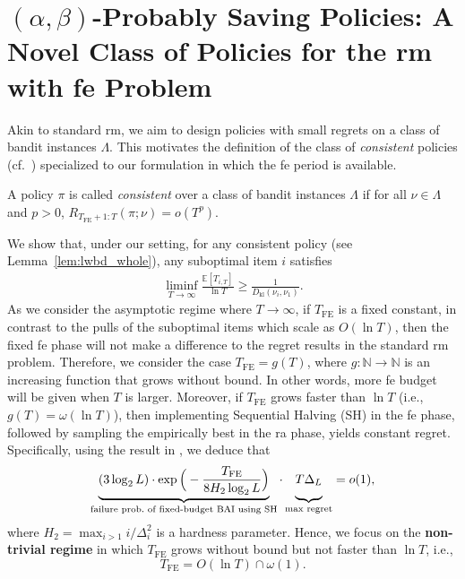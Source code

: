 \documentclass[twoside,11pt]{article}
\newcommand{\kl}{D_{\mathrm{kl}}}
\newcommand{\bbE}{\mathbb{E}}
\newcommand{\bbN}{\mathbb{N}}
\newcommand{\Tfe}{T_{\mathrm{FE}}}
\begin{document}
\section{$(\alpha, \beta)$-Probably Saving Policies: A Novel Class of Policies for the \ac{rm} with \ac{fe} Problem} \label{sec:alpha_beta}
Akin to standard \ac{rm}, we aim to design policies with small regrets on a class of bandit instances $\Lambda$. This motivates the definition of the class of \emph{consistent} policies (cf.\ \citet{lai1985asymptotically}) specialized to our formulation in which the \ac{fe} period is available.
\begin{definition}
    A policy $\pi$ is called \emph{consistent} over a class of bandit instances $\Lambda$ if for all $\nu\in\Lambda$ and $p>0$,
    $
         R_{\Tfe+1:T} (\pi;\nu )= o(T^p). %
    $
\end{definition}
We show that, under our setting, for any consistent policy (see Lemma~\ref{lem:lwbd_whole}), any suboptimal item $i$ satisfies
\begin{align}\label{equ:itemi_lwbd}
    \liminf_{T\to\infty}\frac{\bbE[T_{i,T}]}{\ln T}\geq \frac{1}{\kl(\nu_i,\nu_1)} .
\end{align}
As we  consider the asymptotic regime where $T\to\infty$, if $\Tfe$ is a fixed constant, in contrast to the pulls of the suboptimal items which scale as $O(\ln T)$, then the fixed \ac{fe} phase will not make a difference to the regret results in the standard \ac{rm} problem. 
Therefore, we consider the case $\Tfe = g(T)$, where $g:\bbN\to\bbN$ is an increasing function that grows without bound. In other words, more \ac{fe} budget will be given when $T$ is larger.
Moreover, if $\Tfe$ grows faster than $\ln T$ (i.e., $g(T) = \omega( \ln T )$), then implementing Sequential Halving (SH) \citep{karnin2013optimal} in the \ac{fe} phase, followed by sampling the empirically best  in the \ac{ra} phase, yields constant regret. Specifically, using the result in \citet[Theorem~4.1]{karnin2013optimal}, we deduce that
\begin{align}
    \underbrace{ (3\log_2 L)\cdot \exp\Big(-\frac{\Tfe}{8H_2\log_2 L}\Big)}_{\text{failure prob.\ of fixed-budget BAI using SH}}\cdot \underbrace{\vphantom{\frac{-\Tfe}{8H_2\log_2 L}} T\Delta_{L}}_{\text{max regret}} = o(1),
\end{align}
where $H_2 = \max_{i>1}i/\Delta_i^{2}$ is a hardness parameter. 
Hence, we focus on the \textbf{non-trivial regime} in which $\Tfe$ grows without bound but not faster than $\ln T$, i.e., 
$$\Tfe = O(\ln T)\cap\omega(1).$$
\end{document}
